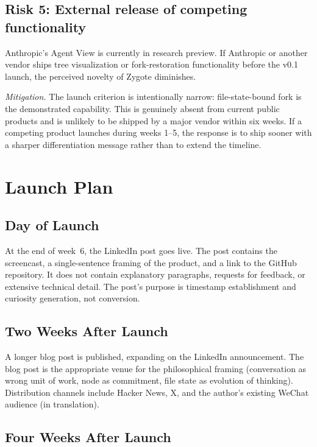 \documentclass[11pt,letterpaper]{article}
\begin{document}
\subsection*{Risk 5: External release of competing functionality}

Anthropic's Agent View is currently in research preview. If Anthropic or another vendor ships tree visualization or fork-restoration functionality before the v0.1 launch, the perceived novelty of Zygote diminishes.

\textit{Mitigation.} The launch criterion is intentionally narrow: file-state-bound fork is the demonstrated capability. This is genuinely absent from current public products and is unlikely to be shipped by a major vendor within six weeks. If a competing product launches during weeks 1--5, the response is to ship sooner with a sharper differentiation message rather than to extend the timeline.

\section{Launch Plan}
\label{sec:launch}

\subsection*{Day of Launch}

At the end of week~6, the LinkedIn post goes live. The post contains the screencast, a single-sentence framing of the product, and a link to the GitHub repository. It does not contain explanatory paragraphs, requests for feedback, or extensive technical detail. The post's purpose is timestamp establishment and curiosity generation, not conversion.

\subsection*{Two Weeks After Launch}

A longer blog post is published, expanding on the LinkedIn announcement. The blog post is the appropriate venue for the philosophical framing (conversation as wrong unit of work, node as commitment, file state as evolution of thinking). Distribution channels include Hacker News, X, and the author's existing WeChat audience (in translation).

\subsection*{Four Weeks After Launch}
\end{document}
